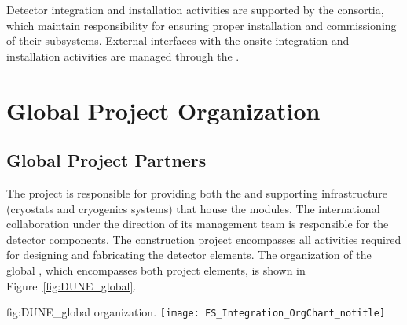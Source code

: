 Detector integration and installation activities are supported by the 
 consortia, which maintain responsibility for ensuring 
proper installation and commissioning of their subsystems.  External 
 interfaces with the onsite integration and installation 
activities are managed through the .




\section{Global Project Organization}
\label{sec:exec-tc-partners}

\subsection{Global Project Partners}

The  project is responsible for providing both the
 and supporting infrastructure (cryostats and
cryogenics systems) that house the  
modules.  The international 
collaboration under the direction of its management team is
responsible for the detector components.  The  
construction project encompasses all activities required for designing
and fabricating the detector elements. %
The organization of the
global , which encompasses both project elements, is
shown in Figure~\ref{fig:DUNE_global}.
\begin{dunefigure}{fig:DUNE_global}
  { organization.}
  \texttt{[image: FS\_Integration\_OrgChart\_notitle]}
\end{dunefigure}

